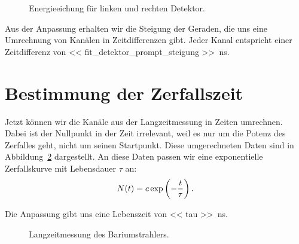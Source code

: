 \begin{figure}[htbp]
    \centering
    \caption{%
        Energieeichung für linken und rechten Detektor.
    }
    \label{fig:fit:zeiteichung}
\end{figure}

Aus der Anpassung erhalten wir die Steigung der Geraden, die uns eine
Umrechnung von Kanälen in Zeitdifferenzen gibt. Jeder Kanal entspricht einer
Zeitdifferenz von \SI{<< fit_detektor_prompt_steigung >>}{\nano\second}.


\section{Bestimmung der Zerfallszeit}

Jetzt können wir die Kanäle aus der Langzeitmessung in Zeiten umrechnen. Dabei
ist der Nullpunkt in der Zeit irrelevant, weil es nur um die Potenz des
Zerfalles geht, nicht um seinen Startpunkt. Diese umgerechneten Daten sind in
Abbildung~\ref{fig:zerfall_daten} dargestellt. An diese Daten passen wir eine
exponentielle Zerfallskurve mit Lebensdauer $\tau$ an:
\[
    N(t) = c \exp\del{-\frac t\tau}.
\]

Die Anpassung gibt uns
eine Lebenszeit von \SI{<< tau >>}{\nano\second}.

\begin{figure}[htbp]
    \centering
    \caption{%
        Langzeitmessung des Bariumstrahlers.
    }
    \label{fig:zerfall_daten}
\end{figure}

